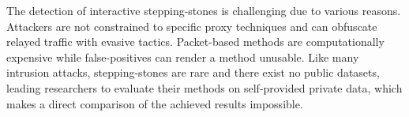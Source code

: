 









The detection of interactive stepping-stones is challenging due to various reasons. Attackers are not constrained to specific proxy techniques and can obfuscate relayed traffic with  evasive tactics. Packet-based methods are computationally expensive while false-positives can render a method unusable. Like many intrusion attacks, stepping-stones are rare and there exist no public datasets, leading researchers to evaluate their methods on self-provided private data, which makes a direct comparison of the achieved results impossible.




